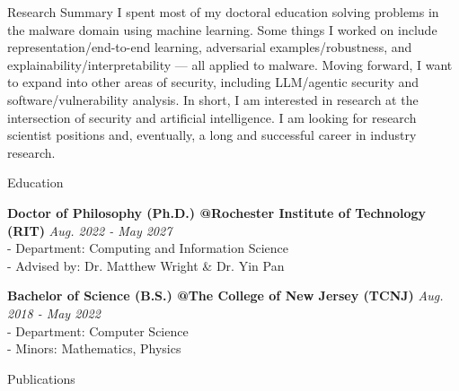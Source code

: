 \documentclass{cv} %
\newcommand{\pubheading}[1]{\par\needspace{3\baselineskip}\noindent\hspace*{-0.8em}{\bfseries #1}} %
\newif\ifextras \extrasfalse %
\newcommand{\statementGeneral}{%
I spent most of my doctoral education solving problems in the malware domain using machine learning. Some things I worked on include representation/end-to-end learning, adversarial examples/robustness, and explainability/interpretability --- all applied to malware. Moving forward, I want to expand into other areas of security, including LLM/agentic security and software/vulnerability analysis. In short, I am interested in research at the intersection of security and artificial intelligence. I am looking for research scientist positions and, eventually, a long and successful career in industry research.
}
\newcommand{\researchstatement}{\statementGeneral}
\begin{document}
\begin{rSection}{Research Summary}
\researchstatement
\end{rSection}

\begin{rSection}{Education}

{\bf Doctor of Philosophy (Ph.D.) @Rochester Institute of Technology (RIT) } \hfill {\em Aug. 2022 - May 2027}
\\ - Department: Computing and Information Science
\\ - Advised by: Dr. Matthew Wright \& Dr. Yin Pan

{\bf Bachelor of Science (B.S.) @The College of New Jersey (TCNJ) } \hfill {\em Aug. 2018 - May 2022} 
\\ - Department: Computer Science
\\ - Minors: Mathematics, Physics

\end{rSection}

\begin{rSection}{Publications}
\nocite{*}
\pubheading{Under Review}
\printbibliography[heading=none, keyword=underreview]

\pubheading{Conference Proceedings}
\printbibliography[heading=none, keyword=conference]

\pubheading{Journal Articles}
\printbibliography[heading=none, keyword=journal]

\pubheading{Workshop Papers}
\printbibliography[heading=none, keyword=workshop]

\pubheading{Poster Sessions}
\ifextras
\printbibliography[heading=none, filter=alltalks]
\else
\printbibliography[heading=none, keyword=poster]
\fi
\end{rSection}
\end{document}
